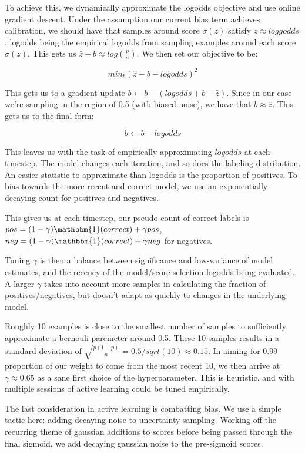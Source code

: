 \documentclass{article}
\begin{document}
To achieve this, we dynamically approximate the logodds objective and use online gradient descent.  Under the assumption our current bias term achieves calibration, we should have that samples around score $\sigma(z)$ satisfy $z \approx loggodds$, logodds being the empirical logodds from sampling examples around each score $\sigma(z)$.  This gets us $\hat{z}-b \approx log(\frac{p}{n})$.  We then set our objective to be:

$$min_b \left(\hat{z}-b-logodds\right)^2$$

This gets us to a gradient update $b \leftarrow b - \left( logodds+b-\hat{z} \right)$.  Since in our case we're sampling in the region of 0.5 (with biased noise), we have that $b \approx \hat{z}$.  This gets us to the final form:

$$b \leftarrow b - logodds$$

This leaves us with the task of empirically approximating $logodds$ at each timestep.  The model changes each iteration, and so does the labeling distribution.  An easier statistic to approximate than logodds is the proportion of positives.  To bias towards the more recent and correct model, we use an exponentially-decaying count for positives and negatives.  

This gives us at each timestep, our pseudo-count of correct labels is $pos=(1-\gamma)\mathbbm{1}(correct)+\gamma pos$, $neg=(1-\gamma)\mathbbm{1}(correct)+\gamma neg$ for negatives.  

Tuning $\gamma$ is then a balance between significance and low-variance of model estimates, and the recency of the model/score selection logodds being evaluated.  A larger $\gamma$ takes into account more samples in calculating the fraction of positives/negatives, but doesn't adapt as quickly to changes in the underlying model.  

Roughly 10 examples is close to the smallest number of samples to sufficiently approximate a bernouli paremeter around 0.5.  These 10 samples results in a standard deviation of $\sqrt{\frac{p(1-p)}{n}} = 0.5/sqrt(10) \approx 0.15$.  In aiming for 0.99 proportion of our weight to come from the most recent 10, we then arrive at $\gamma \approx 0.65$ as a sane first choice of the hyperparameter.  This is heuristic, and with multiple sessions of active learning could be tuned empirically.  

The last consideration in active learning is combatting bias.  We use a simple tactic here: adding decaying noise to uncertainty sampling.  Working off the recurring theme of gaussian additions to scores before being passed through the final sigmoid, we add decaying gaussian noise to the pre-sigmoid scores.  
\end{document}
